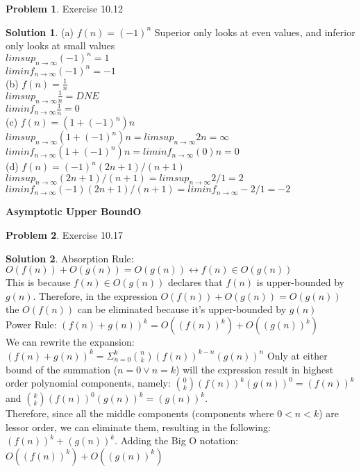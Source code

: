 \documentclass{article}
\theoremstyle{definition}
\newtheorem{problem}{Problem}
\newtheorem*{solution}{Solution}
\begin{document}
\begin{problem}
Exercise 10.12
\begin{solution}
(a) $f(n) = (-1)^n$
Superior only looks at even values, and inferior only looks at small values\\
$lim sup_{n\rightarrow\infty} (-1)^n = 1$\\
$lim inf_{n\rightarrow\infty} (-1)^n = -1$\\
(b) $f(n) = \frac{1}{n}$\\
$lim sup_{n\rightarrow\infty} \frac{1}{n} = DNE$\\
$lim inf_{n\rightarrow\infty} \frac{1}{n} = 0$\\
(c) $f(n) = (1 + (-1)^n)n$\\
$lim sup_{n\rightarrow\infty} (1 + (-1)^n)n = lim sup_{n\rightarrow\infty} 2n = \infty$\\
$lim inf_{n\rightarrow\infty} (1 + (-1)^n)n = lim inf_{n\rightarrow\infty} (0)n = 0$\\
(d) $f(n) = (-1)^n(2n+1)/(n+1)$\\
$lim sup_{n\rightarrow\infty} (2n+1)/(n+1) = lim sup_{n\rightarrow\infty} 2/1 = 2$\\
$lim inf_{n\rightarrow\infty} (-1)(2n+1)/(n+1) = lim inf_{n\rightarrow\infty} -2/1 = -2$\\
\end{solution}
\end{problem}

\noindent \textbf{Asymptotic Upper Bound}\textbf{O} 
\begin{problem}
Exercise 10.17
\begin{solution}
Absorption Rule: $O(f(n)) + O(g(n)) = O(g(n)) \leftrightarrow f(n) \in O(g(n))$\\
This is because $f(n) \in O(g(n))$ declares that $f(n)$ is upper-bounded by $g(n)$. Therefore, in the expression $O(f(n)) + O(g(n)) = O(g(n))$ the $O(f(n))$ can be eliminated because it's upper-bounded by $g(n)$\\
Power Rule: $(f(n) + g(n))^k = O((f(n))^k) + O((g(n))^k)$\\
We can rewrite the expansion: $(f(n) + g(n))^k = \Sigma^k_{n=0} \binom{n}{k}(f(n))^{k-n}(g(n))^n$
Only at either bound of the summation ($n=0 \lor n=k$) will the expression result in highest order polynomial components, namely: $\binom{0}{k}(f(n))^k(g(n))^0 = (f(n))^k$ and $\binom{k}{k}(f(n))^0(g(n))^k = (g(n))^k$.\\
Therefore, since all the middle components (components where $0 < n < k$) are lessor order, we can eliminate them, resulting in the following: $(f(n))^k + (g(n))^k$. Adding the Big O notation: $O((f(n))^k) + O((g(n))^k)$
\end{solution}
\end{problem}
\end{document}
